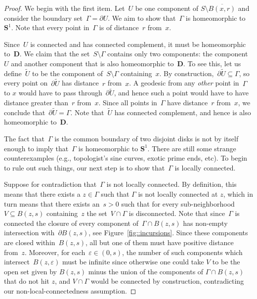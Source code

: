 \documentclass[10pt]{amsart}
\let\epsilon\varepsilon
\theoremstyle{plain}
\numberwithin{theorem}{section}
\theoremstyle{definition}
\newcommand{\D}{\mathbf{D}}
\renewcommand{\S}{{\mathbf S}}
\let\ol\overline
\let\wt\widetilde
\begin{document}
\begin{proof}
We begin with the first item. Let~$U$ be one component of $S \setminus \ol{B(x,r)}$ and consider the boundary set~$\Gamma = \partial U$. We aim to show that~$\Gamma$ is homeomorphic to $\S^1$. Note that every point in~$\Gamma$ is of distance~$r$ from~$x$.

Since~$U$ is connected and has connected complement, it must be homeomorphic to~$\D$. We claim that the set~$S \setminus \Gamma$ contains only two components: the component~$U$ and another component that is also homeomorphic to~$\D$. To see this, let us define~$\wt U$ to be the component of~$S \setminus \Gamma$ containing~$x$. By construction,~$\partial \wt U \subseteq \Gamma$, so every point on~$\partial \wt{U}$ has distance~$r$ from~$x$. A geodesic from any \emph{other} point in~$\Gamma$ to $x$ would have to pass through~$\partial \wt U$, and hence such a point would have to have distance greater than~$r$ from~$x$. Since all points in~$\Gamma$ have distance~$r$ from~$x$, we conclude that~$\partial \wt{U} = \Gamma$. Note that~$\wt U$ has connected complement, and hence is also homeomorphic to~$\D$.

The fact that~$\Gamma$ is the common boundary of two disjoint disks is not by itself enough to imply that~$\Gamma$ is homeomorphic to $\S^1$. There are still some strange counterexamples (e.g., topologist's sine curves, exotic prime ends, etc). To begin to rule out such things, our next step is to show that~$\Gamma$ is locally connected.

Suppose for contradiction that~$\Gamma$ is not locally connected. By definition, this means that there exists a $z \in \Gamma$ such that $\Gamma$ is not locally connected at $z$, which in turn means that there exists an~$s > 0$ such that for every sub-neighborhood~$V \subseteq B(z,s)$ containing~$z$ the set~$V \cap \Gamma$ is disconnected. Note that since~$\Gamma$ is connected the closure of every component of~$\Gamma \cap B(z,s)$ has non-empty intersection with~$\partial B(z,s)$, see Figure~\ref{fig::incursions}. Since these components are closed within~$B(z,s)$, all but one of them must have positive distance from~$z$. Moreover, for each~$\epsilon \in (0,s)$, the number of such components which intersect~$B(z,\epsilon)$ must be infinite since otherwise one could take $V$ to be the open set given by $B(z,s)$ minus the union of the components of $\Gamma \cap B(z,s)$ that do not hit $z$, and $V \cap \Gamma$ would be connected by construction, contradicting our non-local-connectedness assumption.


\end{proof}
\end{document}
